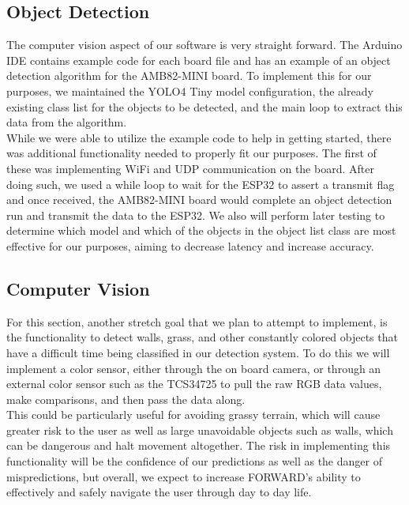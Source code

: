 \subsection{Object Detection}
\noindent The computer vision aspect of our software is very straight forward. The Arduino IDE contains example code for each board file and has an example of an object detection algorithm for the AMB82-MINI board. To implement this for our purposes, we maintained the YOLO4 Tiny model configuration, the already existing class list for the objects to be detected, and the main loop to extract this data from the algorithm. \\

\noindent While we were able to utilize the example code to help in getting started, there was additional functionality needed to properly fit our purposes. The first of these was implementing WiFi and UDP communication on the board. After doing such, we used a while loop to wait for the ESP32 to assert a transmit flag and once received, the AMB82-MINI board would complete an object detection run and transmit the data to the ESP32. We also will perform later testing to determine which model and which of the objects in the object list class are most effective for our purposes, aiming to decrease latency and increase accuracy.

\subsection{Computer Vision}
\noindent For this section, another stretch goal that we plan to attempt to implement, is the functionality to detect walls, grass, and other constantly colored objects that have a difficult time being classified in our detection system. To do this we will implement a color sensor, either through the on board camera, or through an external color sensor such as the TCS34725 to pull the raw RGB data values, make comparisons, and then pass the data along. \\

\noindent This could be particularly useful for avoiding grassy terrain, which will cause greater risk to the user as well as large unavoidable objects such as walls, which can be dangerous and halt movement altogether. The risk in implementing this functionality will be the confidence of our predictions as well as the danger of mispredictions, but overall, we expect to increase FORWARD's ability to effectively and safely navigate the user through day to day life.

